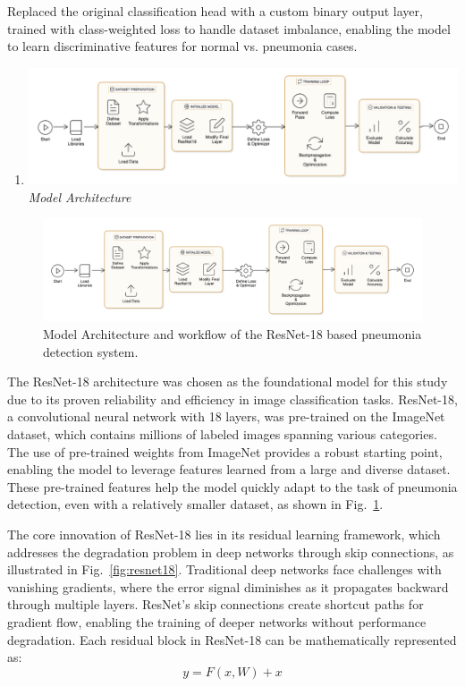 \documentclass[
  twocolumn,
  10pt,
  a4paper,
  journal
]{IEEEtran}
\begin{document}
Replaced the original classification head with a custom binary output layer, trained with class-weighted loss to handle dataset imbalance, enabling the model to learn discriminative features for normal vs. pneumonia cases.

\begin{enumerate}
\def\labelenumi{\Alph{enumi}.}
\setcounter{enumi}{1}
\item
  \includegraphics[width=\columnwidth]{figures/figure1.png}\emph{Model
  Architecture}
\end{enumerate}

\begin{figure}[!t]
\centering
\includegraphics[width=\columnwidth]{figures/figure1.png}
\caption{Model Architecture and workflow of the ResNet-18 based pneumonia detection system.}
\label{fig:model_architecture}
\end{figure}

The ResNet-18 architecture was chosen as the foundational model for this study due to its proven reliability and efficiency in image classification tasks. ResNet-18, a convolutional neural network with 18 layers, was pre-trained on the ImageNet dataset, which contains millions of labeled images spanning various categories. The use of pre-trained weights from ImageNet provides a robust starting point, enabling the model to leverage features learned from a large and diverse dataset. These pre-trained features help the model quickly adapt to the task of pneumonia detection, even with a relatively smaller dataset, as shown in Fig.~\ref{fig:model_architecture}.

The core innovation of ResNet-18 lies in its residual learning framework, which addresses the degradation problem in deep networks through skip connections, as illustrated in Fig.~\ref{fig:resnet18}. Traditional deep networks face challenges with vanishing gradients, where the error signal diminishes as it propagates backward through multiple layers. ResNet's skip connections create shortcut paths for gradient flow, enabling the training of deeper networks without performance degradation. Each residual block in ResNet-18 can be mathematically represented as:
\begin{equation}
y = F(x, W) + x
\end{equation}
\end{document}
